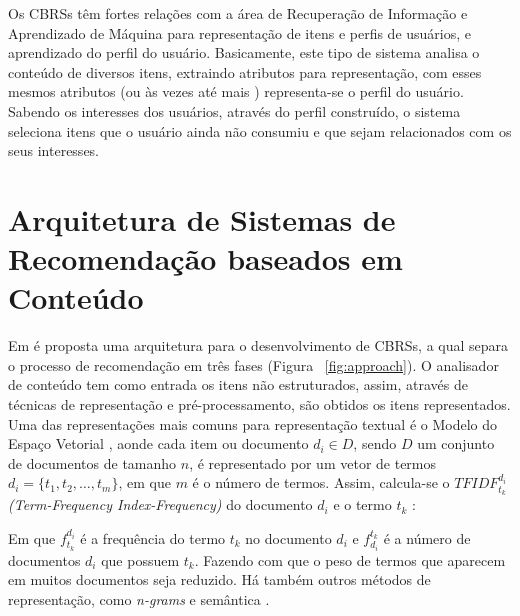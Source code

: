 \documentclass[normaltoc, espacoumemeio, pnumromarab,ruledheader]{abnt}
\begin{document}

Os CBRSs têm fortes relações com a área de Recuperação de Informação \cite{Adomavicius2005,Jannach2011} e Aprendizado de Máquina \cite{Adomavicius2005,Lops2011} para representação de itens e perfis de usuários, e aprendizado do perfil do usuário. Basicamente, este tipo de sistema analisa o conteúdo de diversos itens, extraindo atributos para representação, com esses mesmos atributos (ou às vezes até mais \cite{Capelle2012}) representa-se o perfil do usuário. Sabendo os interesses dos usuários, através do perfil construído, o sistema seleciona itens que o usuário ainda não consumiu e que sejam relacionados com os seus interesses.

\section{Arquitetura de Sistemas de Recomendação baseados em Conteúdo}
\label{sec:arquitetura}

Em \cite{Lops2011} é proposta uma arquitetura para o desenvolvimento de CBRSs, a qual separa o processo de recomendação em três fases (Figura ~\ref{fig:approach}). O analisador de conteúdo tem como entrada os itens não estruturados, assim, através de técnicas de representação e pré-processamento, são obtidos os itens representados. Uma das representações mais comuns \cite{Adomavicius2005,Lops2011,Jannach2011} para representação textual é o Modelo do Espaço Vetorial \cite{Salton1975}, aonde cada item ou documento $d_i \in D$, sendo $D$ um conjunto de documentos de tamanho $n$, é representado por um vetor de termos $d_i = \{t_1, t_2, \dots, t_m\}$, em que $m$ é o número de termos. Assim, calcula-se o \textit{$TFIDF^{d_i}_{t_k}$ (Term-Frequency Index-Frequency)} do documento $d_i$ e o termo $t_k$ \cite{Salton1975}:

Em que $f^{d_i}_{t_k}$ é a frequência do termo $t_k$ no documento $d_i$ e $f^{t_k}_{d_i}$ é a número de documentos $d_i$ que possuem $t_k$. Fazendo com que o peso de termos que aparecem em muitos documentos seja reduzido. Há também outros métodos de representação, como \textit{n-grams} e semântica \cite{Lops2011,Jannach2011}.

\end{document}

